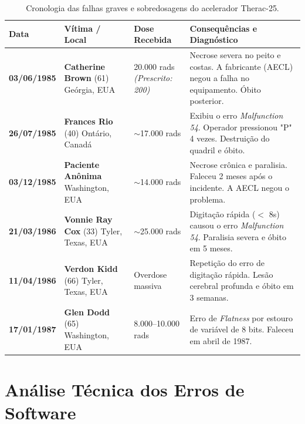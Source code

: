 \documentclass[12pt, a4paper]{article}
\begin{document}
\begin{table}[htbp]
\centering
\small
\begin{tabularx}{\textwidth}{l l p{2.8cm} X}
\toprule
\textbf{Data} & \textbf{Vítima / Local} & \textbf{Dose Recebida} & \textbf{Consequências e Diagnóstico} \\
\midrule
\textbf{03/06/1985} & \textbf{Catherine Brown} (61) \newline Geórgia, EUA & 20.000 rads \newline \textit{(Prescrito: 200)} & Necrose severa no peito e costas. A fabricante (AECL) negou a falha no equipamento. Óbito posterior. \\
\addlinespace
\textbf{26/07/1985} & \textbf{Frances Rio} (40) \newline Ontário, Canadá & $\sim$17.000 rads & Exibiu o erro \textit{Malfunction 54}. Operador pressionou "P" 4 vezes. Destruição do quadril e óbito. \\
\addlinespace
\textbf{03/12/1985} & \textbf{Paciente Anônima} \newline Washington, EUA & $\sim$14.000 rads & Necrose crônica e paralisia. Faleceu 2 meses após o incidente. A AECL negou o problema. \\
\addlinespace
\textbf{21/03/1986} & \textbf{Vonnie Ray Cox} (33) \newline Tyler, Texas, EUA & $\sim$25.000 rads & Digitação rápida ($<$ 8s) causou o erro \textit{Malfunction 54}. Paralisia severa e óbito em 5 meses. \\
\addlinespace
\textbf{11/04/1986} & \textbf{Verdon Kidd} (66) \newline Tyler, Texas, EUA & Overdose massiva & Repetição do erro de digitação rápida. Lesão cerebral profunda e óbito em 3 semanas. \\
\addlinespace
\textbf{17/01/1987} & \textbf{Glen Dodd} (65) \newline Washington, EUA & 8.000--10.000 rads & Erro de \textit{Flatness} por estouro de variável de 8 bits. Faleceu em abril de 1987. \\
\bottomrule
\end{tabularx}
\caption{Cronologia das falhas graves e sobredosagens do acelerador Therac-25.}
\label{tab:cronologia}
\end{table}

\section{Análise Técnica dos Erros de Software}
\end{document}
